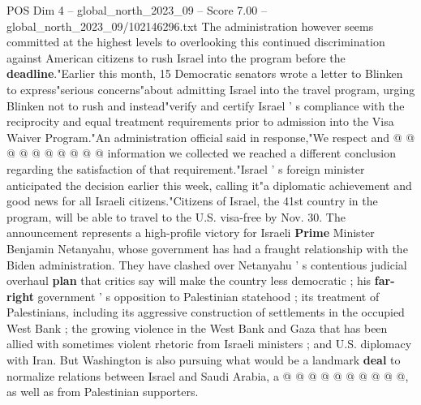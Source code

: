 \begin{textsample}{POS Dim 4 – global\_north\_2023\_09 – Score 7.00 – global\_north\_2023\_09/102146296.txt}
The administration however seems committed at the highest levels to overlooking this continued discrimination against American citizens to rush Israel into the program before the \textbf{deadline}."Earlier this month, 15 Democratic senators wrote a letter to Blinken to express"serious concerns"about admitting Israel into the travel program, urging Blinken not to rush and instead"verify and certify Israel ' s compliance with the reciprocity and equal treatment requirements prior to admission into the Visa Waiver Program."An administration official said in response,"We respect and @ @ @ @ @ @ @ @ @ @ information we collected we reached a different conclusion regarding the satisfaction of that requirement."Israel ' s foreign minister anticipated the decision earlier this week, calling it"a diplomatic achievement and good news for all Israeli citizens."Citizens of Israel, the 41st country in the program, will be able to travel to the U.S. visa-free by Nov. 30.
The announcement represents a high-profile victory for Israeli \textbf{Prime} Minister Benjamin Netanyahu, whose government has had a fraught relationship with the Biden administration.
They have clashed over Netanyahu ' s contentious judicial overhaul \textbf{plan} that critics say will make the country less democratic ; his \textbf{far-right} government ' s opposition to Palestinian statehood ; its treatment of Palestinians, including its aggressive construction of settlements in the occupied West Bank ; the growing violence in the West Bank and Gaza that has been allied with sometimes violent rhetoric from Israeli ministers ; and U.S. diplomacy with Iran.
But Washington is also pursuing what would be a landmark \textbf{deal} to normalize relations between Israel and Saudi Arabia, a @ @ @ @ @ @ @ @ @ @, as well as from Palestinian supporters.

\end{textsample}
